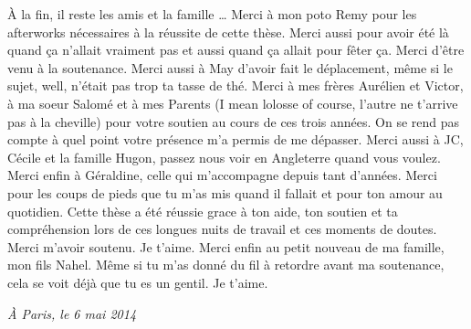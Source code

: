 \newpage

\`A la fin, il reste les amis et la famille \ldots{}
Merci à mon poto Remy pour les afterworks nécessaires
à la réussite de cette thèse. Merci aussi pour avoir été
là quand ça n'allait vraiment pas et aussi quand ça
allait pour fêter ça. Merci d'être venu à la soutenance.
Merci aussi à May d'avoir fait le déplacement, même
si le sujet, well, n'était pas trop ta tasse de thé.
Merci à mes frères Aurélien et Victor, à ma soeur Salomé et à mes
Parents (I mean lolosse of course, l'autre ne t'arrive pas
à la cheville) pour votre soutien au cours de ces trois années.
On se rend pas compte à quel point votre présence m'a permis de
me dépasser. Merci aussi à JC, Cécile et la famille Hugon, passez 
nous voir en Angleterre quand vous voulez. Merci enfin à Géraldine, celle qui 
m'accompagne depuis tant d'années. Merci pour les coups
de pieds que tu m'as mis quand il fallait et pour ton
amour au quotidien. Cette thèse a été réussie grace à ton aide,
ton soutien et ta compréhension lors de ces longues nuits 
de travail et ces moments de doutes. Merci m’avoir soutenu. Je t'aime.
Merci enfin au petit nouveau de ma famille, mon fils Nahel.
Même si tu m'as donné du fil à retordre avant ma soutenance,
cela se voit déjà que tu es un gentil. Je t'aime.

\begin{flushright}
\emph{\`A Paris, le 6 mai 2014}
\end{flushright}
